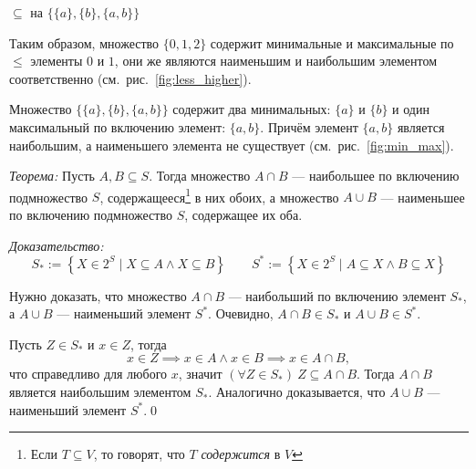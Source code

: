 \begin{marginfigure}
  \center

  \caption{$\subseteq$ на $\{\{a\},\{b\},\{a,b\}\}$}\label{fig:min_max}
\end{marginfigure}

Таким образом, множество $\{0,1,2\}$ содержит минимальные и максимальные по $\leq$
элементы $0$ и $1$, они же являются наименьшим и
наибольшим элементом соответственно (см.~рис.~\ref{fig:less_higher}).

Множество $\{\{a\},\{b\},\{a,b\}\}$ содержит
два минимальных: $\{a\}$ и $\{b\}$ и один максимальный
по включению элемент: $\{a,b\}$. Причём элемент $\{a,b\}$ является наибольшим, а
наименьшего элемента не существует (см.~рис.~\ref{fig:min_max}).

\pagebreak
{\it Теорема:} Пусть $A,B\subseteq S$. Тогда множество $A\cap B$ ---
наибольшее по включению подмножество $S$, содержащееся\footnote{Если $T\subseteq V$,
  то говорят, что $T$ {\it содержится}
  в $V$} в них обоих,
а множество $A\cup B$ --- наименьшее по включению подмножество $S$,
содержащее их оба.

{\it Доказательство:}
\[
  S_{*}:=\left\{X\in 2^{S}\;\big|\; X\subseteq A\land X\subseteq B\right\}\qquad
  S^{*}:=\left\{X\in 2^{S}\;\big|\; A\subseteq X\land B\subseteq X\right\}
\]

Нужно доказать, что множество $A\cap B$ --- наибольший по включению элемент $S_{*}$,
а $A\cup B$ --- наименьший элемент $S^{*}$.
Очевидно, $A\cap B\in S_{*}$ и $A\cup B\in S^{*}$.

Пусть $Z\in S_{*}$ и $x\in Z$, тогда
\[
  x\in Z\implies x\in A\land x\in B\implies x\in A\cap B,
\]
что справедливо для любого $x$,
значит ${(\forall Z\in S_{*})~Z\subseteq A\cap B}$. Тогда
$A\cap B$ является наибольшим элементом $S_{*}$.
Аналогично доказывается, что $A\cup B$ --- наименьший элемент $S^{*}$.\qed

